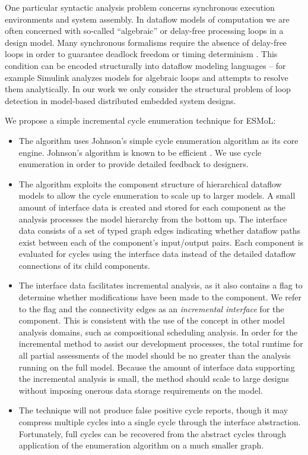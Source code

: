 One particular syntactic analysis problem concerns synchronous execution environments and system assembly.  In dataflow models of computation we are often concerned with so-called ``algebraic'' or delay-free processing loops in a design model.  Many synchronous formalisms require the absence of delay-free loops in order to guarantee deadlock freedom \cite{moc:ltta} or timing determinism \cite{moc:sdf}. This condition can be encoded structurally into dataflow modeling languages -- for example Simulink \cite{tools:mathworks} analyzes models for algebraic loops and attempts to resolve them analytically.  In our work we only consider the structural problem of loop detection in model-based distributed embedded system designs.

We propose a simple incremental cycle enumeration technique for ESMoL:

\begin{itemize}
\item The algorithm uses Johnson's simple cycle enumeration algorithm as its 
core engine\cite{cycles:johnson75}.  Johnson's algorithm is known to be 
efficient \cite{cycles:mateti76}.  We use cycle enumeration in order to provide detailed feedback to designers.
\item The algorithm exploits the component structure of hierarchical dataflow 
models to allow the cycle enumeration to scale up to larger models.   A small amount of interface data is created and stored for each component as the analysis processes the model hierarchy from the bottom up.  The interface data consists of a set of typed graph edges indicating whether dataflow paths exist between each of the component's input/output pairs.  Each component is evaluated for cycles using the interface data instead of the detailed dataflow connections of its child components.
\item   The interface data facilitates incremental analysis, as it also contains a flag to determine whether modifications have been made to the component.  We refer to the flag and the connectivity edges as an \emph{incremental interface} for the component.  This is consistent with the use of the concept in other model analysis domains, such as compositional scheduling analysis\cite{sched:easwaran}. In order for the incremental method to assist our development processes, the total runtime for all partial assessments of the model should be no greater than the analysis running on the full model.  Because the amount of interface data supporting the incremental analysis is small, the method should scale to large designs without imposing onerous data storage requirements on the model.
\item The technique will not produce false positive cycle reports, though it 
may compress multiple cycles into a single cycle through the interface abstraction.  Fortunately,
full cycles can be recovered from the abstract cycles through application
of the enumeration algorithm on a much smaller graph.
\end{itemize}

